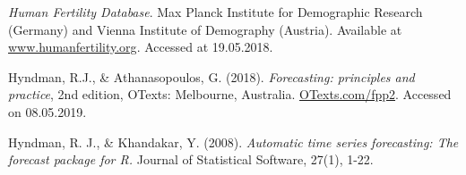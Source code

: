 \documentclass[a4paper, 12pt]{scrartcl}
\begin{document}
\newpage
\begin{thebibliography}{3}
	 \emph{Human Fertility Database}. Max Planck Institute for Demographic Research (Germany) and Vienna Institute of Demography (Austria). Available at \href{www.humanfertility.org}{www.humanfertility.org}. Accessed at 19.05.2018.
	
	 Hyndman, R.J., \& Athanasopoulos, G. (2018). \emph{Forecasting: principles and practice}, 2nd edition, OTexts: Melbourne, Australia. \href{https://otexts.com/fpp2/}{OTexts.com/fpp2}. Accessed on 08.05.2019.
	
	 Hyndman, R. J., \& Khandakar, Y. (2008). \emph{Automatic time series forecasting: The forecast package for R.} Journal of Statistical Software, 27(1), 1-22.
\end{thebibliography}
\end{document}

